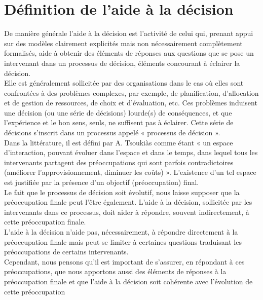 \section{Définition de l’aide à la décision}
De manière générale l’aide à la décision est l’activité de celui qui, prenant appui sur des modèles clairement explicités mais non nécessairement complètement formalisés, aide à obtenir des éléments de réponses aux questions que se pose un intervenant dans un processus de décision, éléments concourant à éclairer la décision.\\
Elle est généralement sollicitée par des organisations dans le cas où elles sont confrontées à des problèmes complexes, par exemple, de planification, d’allocation et de gestion de ressources, de choix et d’évaluation, etc. Ces problèmes induisent une décision (ou une série de décisions) lourde(s) de conséquences, et que l’expérience et le bon sens, seuls, ne suffisent pas à éclairer. Cette série de décisions s’inscrit dans un processus appelé « processus de décision ».\\
Dans la littérature, il est défini par A. Tsoukiàs comme étant « un espace d’interaction, pouvant évoluer dans l’espace et dans le temps, dans lequel tous les intervenants partagent des préoccupations qui sont parfois contradictoires (améliorer l’approvisionnement, diminuer les coûts) ». L’existence d’un tel espace est justifiée par la présence d’un objectif (préoccupation) final.\\ 
Le fait que le processus de décision soit évolutif, nous laisse supposer que la préoccupation finale peut l’être également. L’aide à la décision, sollicitée par les intervenants dans ce processus, doit aider à répondre, souvent indirectement, à cette préoccupation finale.\\ 
\newpage
L’aide à la décision n’aide pas, nécessairement, à répondre directement à la préoccupation finale mais peut se limiter à certaines questions traduisant les préoccupations de certains intervenants.\\ 
Cependant, nous pensons qu’il est important de s’assurer, en répondant à ces préoccupations, que nous apportons aussi des éléments de réponses à la préoccupation finale et que l’aide à la décision soit cohérente avec l’évolution de cette préoccupation

